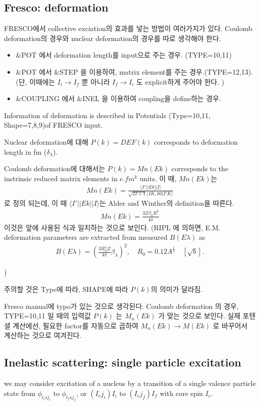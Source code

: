 \documentclass[11pt]{book}
\def\la{\langle}
\def\ra{\rangle}
\newcommand{\bea}{\begin{eqnarray}}
\newcommand{\eea}{\end{eqnarray}}
\begin{document}
\subsection{Fresco: deformation}
FRESCO에서 collective exciation의 효과를 넣는 방법이 여러가지가 있다. 
Coulomb deformation의 경우와 nuclear deformation의 경우를 따로 생각해야 한다. 

\begin{itemize}
\item \&POT 에서 deformation length를 input으로 주는 경우.
      (TYPE=10,11) 
\item \&POT 에서 \&STEP 을 이용하여, matrix element를 주는 경우.(TYPE=12,13).
       (단, 이때에는 
       $I_i\to I_f$ 뿐 아니라 $I_f\to I_i$ 도 explicit하게 주어야 한다. )
\item \&COUPLING 에서 \&INEL 을 이용하여 coupling을 define하는 경우.        
\end{itemize}

Information of deformation is described in Potentials 
(Type=10,11, Shape=7,8,9)of FRESCO input.

Nuclear deformation에 대해 $P(k)=DEF(k)$ corresponds to 
deformation length in fm ($\delta_\lambda$). 

Coulomb deformation에 대해서는 $P(k)=Mn(Ek)$ corresponds to
the instrinsic reduced matrix elements in $e.fm^k$ units. 
이 때, $Mn(Ek)$는 
\bea 
Mn(Ek)=\frac{\la I'||Ek||I\ra}{\sqrt{2I+1}\la I K,k0|I' K\ra} 
\eea 
로 정의 되는데, 이 때 $\la I'||Ek||I\ra$는 Alder and Winther의 definition을 따른다.  
\bea 
Mn(Ek)=\frac{3 Z\beta_k R^k}{4\pi}
\eea 
이것은 앞에 사용된 식과 일치하는 것으로 보인다. 
(RIPL 에 의하면, E.M. deformation parameters are extracted from measured $B(E\lambda)$ as
\bea 
B(E\lambda) = \left(\frac{3 R_0^\lambda Z}{4\pi}\beta_\lambda\right)^2,\quad R_0=0.12 A^{\frac{1}{3}}\quad [\sqrt{b}].
\eea 

 )


주의할 것은 Type에 따라, SHAPE에 따라 $P(k)$의 의미가 달라짐. 

Fresco manual에 typo가 있는 것으로 생각된다. 
{\color{red} Coulomb deformation 의 경우, TYPE=10,11 일 때의 입력값 $P(k)$ 는 $M_n(Ek)$ 가 맞는 것으로 보인다.}
실제 포텐셜 계산에선, 필요한 factor를 자동으로 곱하여  $M_n(Ek)\to M(Ek)$ 로 바꾸어서 계산하는 것으로 여겨진다. 


\subsection{Inelastic scattering: single particle excitation}
we may consider excitation of a nucleus by a transition of a 
single valence particle state from $\phi_{l_i s j_i}$ to $\phi_{l_f s j_f}$,
or $(I_c j_i)I_i$ to $(I_c j_f)I_f$ with core spin $I_c$.
\end{document}
